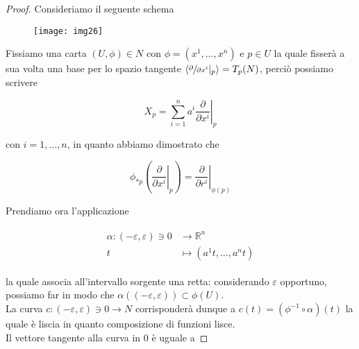 \begin{proof}
	Consideriamo il seguente schema
	
	\begin{figure}[H]
		\centering
		\texttt{[image: img26]}
	\end{figure}

	Fissiamo una carta $ (U,\phi) \in N $ con $ \phi = (x^{1},\dots,x^{n}) $ e $ p \in U $ la quale fisserà a sua volta una base per lo spazio tangente $ \langle \sfrac{\partial}{\partial x^{i}} |_{p} \rangle = T_{p}(N) $, perciò possiamo scrivere
	
	\begin{equation}
		X_{p} = \sum_{i=1}^{n} a^{i} \left. \dfrac{\partial}{\partial x^{i}} \right|_{p}
	\end{equation}

	con $ i=1,\dots,n $, in quanto abbiamo dimostrato che
	
	\begin{equation}
		\phi_{*p} \left( \left. \dfrac{\partial}{\partial x^{i}} \right|_{p} \right) = \left. \dfrac{\partial}{\partial r^{i}} \right|_{\phi(p)}
	\end{equation}
	
	Prendiamo ora l'applicazione
	
	\begin{align}
		\begin{split}
			\alpha : (-\varepsilon,\varepsilon) \ni 0 &\to \mathbb{R}^{n}\\
			t &\mapsto (a^{1} t, \dots, a^{n} t)
		\end{split}
	\end{align}

	la quale associa all'intervallo sorgente una retta: considerando $ \varepsilon $ opportuno, possiamo far in modo che $ \alpha((-\varepsilon,\varepsilon)) \subset \phi(U) $.\\
	La curva $ c : (-\varepsilon,\varepsilon) \ni 0 \to N $ corrisponderà dunque a $ c(t) = (\phi^{-1} \circ \alpha)(t) $ la quale è liscia in quanto composizione di funzioni lisce.\\
	Il vettore tangente alla curva in 0 è uguale a
	

\end{proof}
